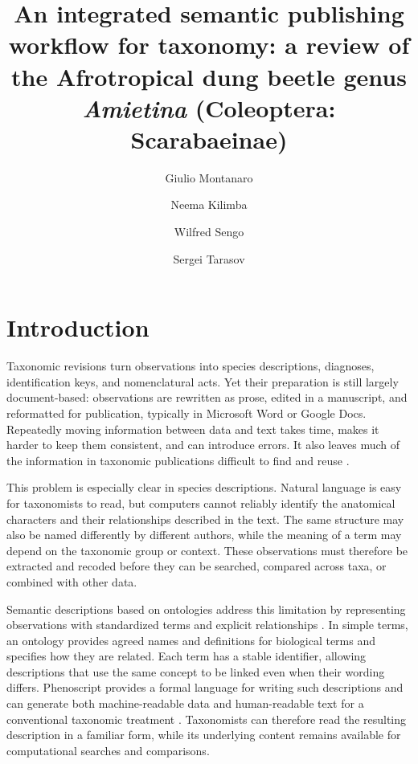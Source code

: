 \documentclass[fleqn,10pt,lineno]{wlpeerj}
\title{
An integrated semantic publishing workflow for taxonomy: a review of the Afrotropical dung beetle genus \textit{Amietina} (Coleoptera: Scarabaeinae)
}
\author[1]{Giulio Montanaro}
\author[2]{Neema Kilimba}
\author[2]{Wilfred Sengo}
\author[1]{Sergei Tarasov}
\affil[1]{Finnish Museum of Natural History, Pohjoinen Rautatiekatu 13, FI-00014 Helsinki, Finland}
\affil[2]{Tanzania Wildlife Research Institute (TAWIRI), P.O. Box 661, 206 Njiro Road, 2113 Lemara, Arusha, Tanzania}
\begin{document}
\flushbottom
\maketitle
\thispagestyle{empty}



\section*{Introduction}

Taxonomic revisions turn observations into species descriptions, diagnoses, identification keys, and nomenclatural acts. Yet their preparation is still largely document-based: observations are rewritten as prose, edited in a manuscript, and reformatted for publication, typically in Microsoft Word or Google Docs. Repeatedly moving information between data and text takes time, makes it harder to keep them consistent, and can introduce errors. It also leaves much of the information in taxonomic publications difficult to find and reuse \citep{smith2013beyond, miller2012cybertaxonomic, penev2017strategies}.

This problem is especially clear in species descriptions. Natural language is easy for taxonomists to read, but computers cannot reliably identify the anatomical characters and their relationships described in the text. The same structure may also be named differently by different authors, while the meaning of a term may depend on the taxonomic group or context. These observations must therefore be extracted and recoded before they can be searched, compared across taxa, or combined with other data.

Semantic descriptions based on ontologies address this limitation by representing observations with standardized terms and explicit relationships \citep{balhoff2013semantic, deans2015phenotypes}. In simple terms, an ontology provides agreed names and definitions for biological terms and specifies how they are related. Each term has a stable identifier, allowing descriptions that use the same concept to be linked even when their wording differs. Phenoscript provides a formal language for writing such descriptions and can generate both machine-readable data and human-readable text for a conventional taxonomic treatment \citep{montanaro2024beyond, montanaro2024computable}. Taxonomists can therefore read the resulting description in a familiar form, while its underlying content remains available for computational searches and comparisons.
\end{document}
